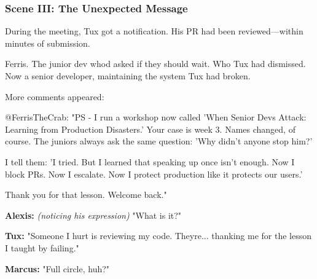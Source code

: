 \bookdivider

\subsubsection{Scene III: The Unexpected Message}\label{scene-iii-the-unexpected-message}

During the meeting, Tux got a notification. His PR had been reviewed---within minutes of submission.


Ferris. The junior dev who\textquotesingle d asked if they should wait. Who Tux had dismissed. Now a senior developer, maintaining the system Tux had broken.

More comments appeared:

\begin{codeblock}
@FerrisTheCrab:
"PS - I run a workshop now called 'When Senior Devs Attack: 
Learning from Production Disasters.' Your case is week 3. 
Names changed, of course. The juniors always ask the same 
question: 'Why didn't anyone stop him?'

I tell them: 'I tried. But I learned that speaking up once 
isn't enough. Now I block PRs. Now I escalate. Now I protect 
production like it protects our users.'

Thank you for that lesson. Welcome back."
\end{codeblock}

\textbf{Alexis:} \emph{(noticing his expression)} "What is it?"

\textbf{Tux:} "Someone I hurt is reviewing my code. They\textquotesingle re... thanking me for the lesson I taught by failing."

\textbf{Marcus:} "Full circle, huh?"

